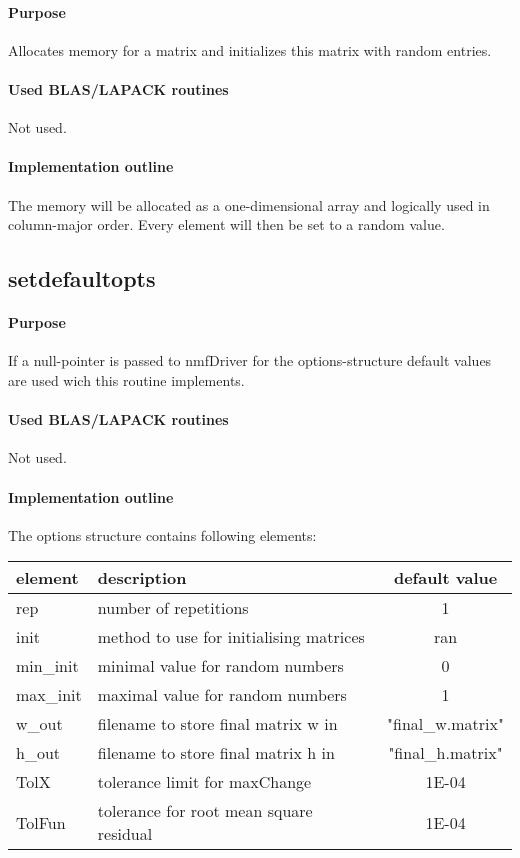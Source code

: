 \documentclass[a4paper,10pt]{scrartcl}
\begin{document}
			\paragraph{Purpose}

			Allocates memory for a matrix and initializes this matrix with random entries.

			\paragraph{Used BLAS/LAPACK routines}

			Not used.

			\paragraph{Implementation outline}

			The memory will be allocated as a one-dimensional array and logically used in column-major 
			order. Every element will then be set to a random value.
			

		\subsection{setdefaultopts}

			\paragraph{Purpose}

			If a null-pointer is passed to nmfDriver for the options-structure default values are used
 			wich this routine implements.

			\paragraph{Used BLAS/LAPACK routines}

			Not used.

			\paragraph{Implementation outline}

			The options structure contains following elements:\newline

			\begin{tabular}{l|l|c}
 			 	element & description & default value\\
				\hline
 				rep & number of repetitions & 1\\
 				init & method to use for initialising matrices & ran\\
 				min\_init & minimal value for random numbers & 0\\
 				max\_init & maximal value for random numbers & 1\\
 				w\_out & filename to store final matrix w in & "final\_w.matrix"\\
 				h\_out & filename to store final matrix h in & "final\_h.matrix"\\
 				TolX & tolerance limit for maxChange & 1E-04\\
 				TolFun & tolerance for root mean square residual & 1E-04\\
			\end{tabular}
\end{document}
